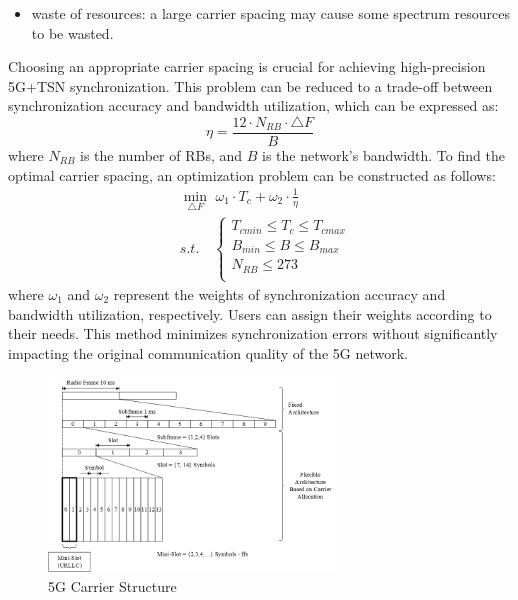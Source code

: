\documentclass[english]{cccconf}
\begin{document}
{\begin{itemize}
	\item waste of resources: a large carrier spacing may cause some spectrum resources to be wasted.
\end{itemize}
Choosing an appropriate carrier spacing is crucial for achieving high-precision 5G+TSN synchronization. This problem can be reduced to a trade-off between synchronization accuracy and bandwidth utilization, which can be expressed as:
\begin{equation}
	\eta=\frac{12\cdot N_{RB}\cdot \triangle F}{B}
\end{equation}
where $N_{RB}$ is the number of RBs, and $B$ is the network's bandwidth. To find the optimal carrier spacing, an optimization problem can be constructed as follows:
\begin{equation}
	\begin{split}
		&\min_{\triangle F} \,\, \omega_1 \cdot T_c+\omega_2 \cdot \frac{1}{\eta} \\
		&s.t.\quad  \left\{\begin{array}{lc}
			T_{cmin}\leq T_c \leq T_{cmax}\\
			B_{min}\leq B \leq B_{max}\\
			N_{RB}\leq 273\\
		\end{array}\right.
	\end{split}
\end{equation}
where $\omega_1$ and $\omega_2$ represent the weights of synchronization accuracy and bandwidth utilization, respectively. Users can assign their weights according to their needs. This method minimizes synchronization errors without significantly impacting the original communication quality of the 5G network.
\begin{figure}[htbp]
	\centering
	\setcounter{figure}{4}
	\includegraphics[width=3in]{fig14.png}
	\caption{5G Carrier Structure}
\end{figure}
}
\end{document}
